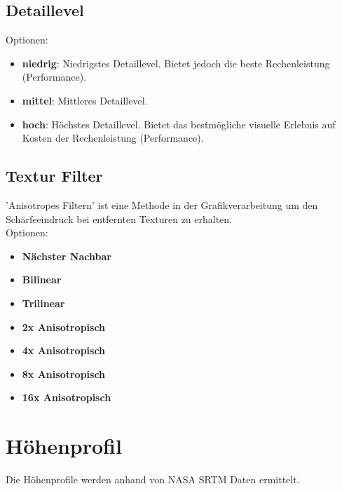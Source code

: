 \documentclass[10pt]{scrreprt}
\begin{document}
\vspace{3mm}
\subsection{Detaillevel}  

Optionen:
\begin{itemize}
\item \textbf{niedrig}: Niedrigstes Detaillevel. Bietet jedoch die beste Rechenleistung (Performance).
\item \textbf{mittel}: Mittleres Detaillevel.
\item \textbf{hoch}: Höchstes Detaillevel. Bietet das bestmögliche visuelle Erlebnis auf Kosten der Rechenleistung (Performance).
\end{itemize}


\vspace{3mm}
\subsection{Textur Filter}  


'Anisotropes Filtern'  ist eine Methode in der Grafikverarbeitung um den Schärfeeindruck bei entfernten Texturen zu erhalten.\\

Optionen:
\begin{itemize}
\item \textbf{Nächster Nachbar}
\item \textbf{Bilinear}
\item \textbf{Trilinear}
\item \textbf{2x Anisotropisch}
\item \textbf{4x Anisotropisch}
\item \textbf{8x Anisotropisch}
\item \textbf{16x Anisotropisch}
\end{itemize}





\vspace{3mm}
\section{Höhenprofil} 
Die Höhenprofile werden anhand von NASA  SRTM  Daten ermittelt.

\end{document}
